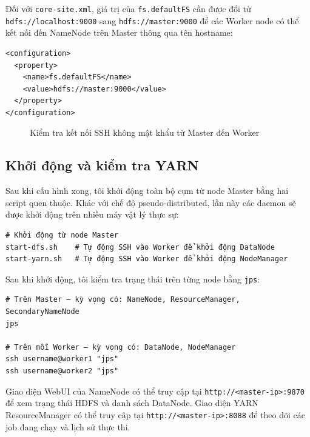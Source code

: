 \documentclass[12pt]{article}
\begin{document}
Đối với \texttt{core-site.xml}, giá trị của \texttt{fs.defaultFS} cần được đổi từ
\texttt{hdfs://localhost:9000} sang \texttt{hdfs://master:9000} để các Worker node
có thể kết nối đến NameNode trên Master thông qua tên hostname:

\begin{verbatim}
<configuration>
  <property>
    <name>fs.defaultFS</name>
    <value>hdfs://master:9000</value>
  </property>
</configuration>
\end{verbatim}

\begin{figure}[H]
  \centering
  \caption{Kiểm tra kết nối SSH không mật khẩu từ Master đến Worker}
  \label{fig:ssh-test}
\end{figure}

\subsection{Khởi động và kiểm tra YARN}

Sau khi cấu hình xong, tôi khởi động toàn bộ cụm từ node Master bằng hai script
quen thuộc. Khác với chế độ pseudo-distributed, lần này các daemon sẽ được khởi
động trên nhiều máy vật lý thực sự:

\begin{verbatim}
# Khởi động từ node Master
start-dfs.sh    # Tự động SSH vào Worker để khởi động DataNode
start-yarn.sh   # Tự động SSH vào Worker để khởi động NodeManager
\end{verbatim}

Sau khi khởi động, tôi kiểm tra trạng thái trên từng node bằng \texttt{jps}:

\begin{verbatim}
# Trên Master — kỳ vọng có: NameNode, ResourceManager, SecondaryNameNode
jps

# Trên mỗi Worker — kỳ vọng có: DataNode, NodeManager
ssh username@worker1 "jps"
ssh username@worker2 "jps"
\end{verbatim}

Giao diện WebUI của NameNode có thể truy cập tại
\texttt{http://<master-ip>:9870} để xem trạng thái HDFS và danh sách DataNode. Giao
diện YARN ResourceManager có thể truy cập tại
\texttt{http://<master-ip>:8088} để theo dõi các job đang chạy và lịch sử thực thi.
\end{document}
